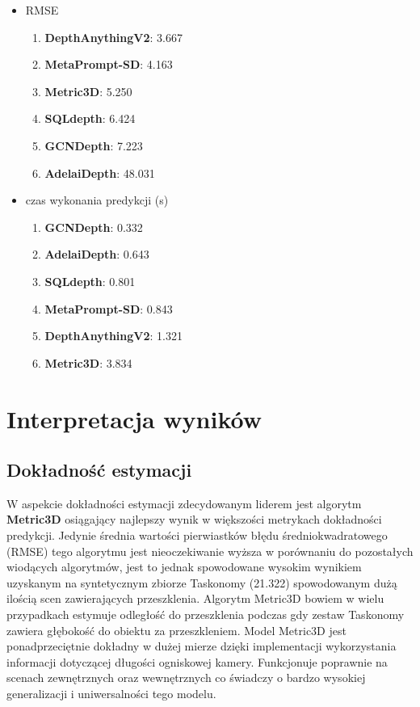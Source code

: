 \begin{itemize}
    \item RMSE
    \begin{enumerate}
        \item \textbf{DepthAnythingV2}: 3.667
        \item \textbf{MetaPrompt-SD}: 4.163
        \item \textbf{Metric3D}: 5.250
        \item \textbf{SQLdepth}: 6.424
        \item \textbf{GCNDepth}: 7.223
        \item \textbf{AdelaiDepth}: 48.031
    \end{enumerate}

    \item czas wykonania predykcji (s)
    \begin{enumerate}
        \item \textbf{GCNDepth}: 0.332
        \item \textbf{AdelaiDepth}: 0.643
        \item \textbf{SQLdepth}: 0.801
        \item \textbf{MetaPrompt-SD}: 0.843
        \item \textbf{DepthAnythingV2}: 1.321
        \item \textbf{Metric3D}: 3.834
    \end{enumerate}
\end{itemize}

\section{Interpretacja wyników}
\subsection{Dokładność estymacji}
W aspekcie dokładności estymacji zdecydowanym liderem jest algorytm \textbf{Metric3D} osiągający najlepszy wynik w większości metrykach dokładności predykcji. Jedynie średnia wartości pierwiastków błędu średniokwadratowego (RMSE) tego algorytmu jest nieoczekiwanie wyższa w porównaniu do pozostałych wiodących algorytmów, jest to jednak spowodowane wysokim wynikiem uzyskanym na syntetycznym zbiorze Taskonomy (21.322) spowodowanym dużą ilością scen zawierających przeszklenia. Algorytm Metric3D bowiem w wielu przypadkach estymuje odległość do przeszklenia podczas gdy zestaw Taskonomy zawiera głębokość do obiektu za przeszkleniem. Model Metric3D jest ponadprzeciętnie dokładny w dużej mierze dzięki implementacji wykorzystania informacji dotyczącej długości ogniskowej kamery. Funkcjonuje poprawnie na scenach zewnętrznych oraz wewnętrznych co świadczy o bardzo wysokiej generalizacji i uniwersalności tego modelu.

